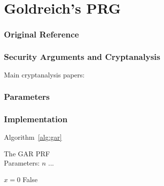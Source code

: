 \section{Goldreich's PRG}
\label{sec:goldreich}


\subsubsection*{Original Reference}

\subsubsection*{Security Arguments and Cryptanalysis}
Main cryptanalysis papers:

\cite{DBLP:journals/eccc/ECCC-TR00-090}
\cite{DBLP:conf/mfcs/CryanM01}
\cite{FOCS:MosShpTre03}
\cite{DBLP:conf/approx/BogdanovQ09}
\cite{TCC:CEMT09}
\cite{DBLP:conf/csr/ItsyksonS11}
\cite{STOC:Applebaum12}
\cite{TCC:AppBogRos12}
\cite{DBLP:conf/coco/ODonnellW14}
\cite{DBLP:journals/mst/Itsykson14}
\cite{EPRINT:Applebaum15}
\cite{STOC:AppLov16}
\cite{TCC:AppRay16b}
\cite{TCC:LomVai17}
\cite{AC:CDMRR18}
\cite{DBLP:conf/focs/ApplebaumK19}
\cite{DBLP:journals/ccds/Meaux21}
\cite{DBLP:journals/dam/Meaux22}
\cite{DBLP:journals/cc/OliveiraST22}
\cite{DBLP:journals/tit/YangGJL22}
\cite{DBLP:journals/dcc/DupinMR23}
\cite{EPRINT:Unal23b}
\cite{EC:Unal23}



\subsubsection*{Parameters}


\subsubsection*{Implementation}

Algorithm~\ref{alg:gar}

\begin{algorithm}
  \caption{\label{alg:gar}The GAR PRF \\
    Parameters: $n$ ...}
  \begin{algorithmic}
    \State $x = 0$
    \Return False
  \end{algorithmic}
\end{algorithm}




